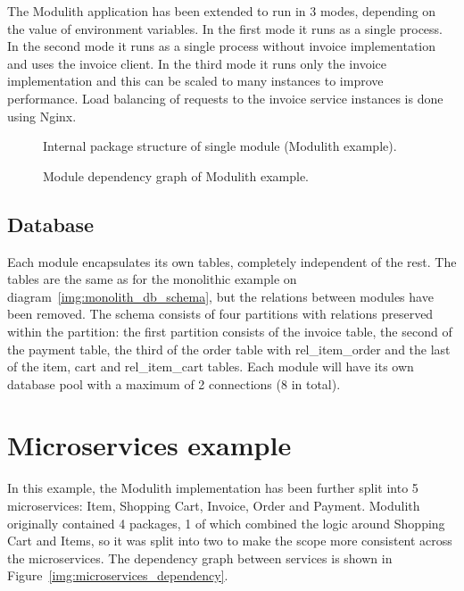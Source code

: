 The Modulith application has been extended to run in 3 modes, depending on the value of environment variables. In the first mode it runs as a single process. In the second mode it runs as a single process without invoice implementation and uses the invoice client. In the third mode it runs only the invoice implementation and this can be scaled to many instances to improve performance. Load balancing of requests to the invoice service instances is done using Nginx.

\begin{figure}
    \centering
    
    \caption{Internal package structure of single module (Modulith example).\label{img:modulith_module_package}}
\end{figure}

\begin{figure}
    \centering
    
    \caption{Module dependency graph of Modulith example. \label{img:modulith_package}}
\end{figure}

\subsection{Database}
Each module encapsulates its own tables, completely independent of the rest. The tables are the same as for the monolithic example on diagram~\ref{img:monolith_db_schema}, but the relations between modules have been removed. The schema consists of four partitions with relations preserved within the partition: the first partition consists of the invoice table, the second of the payment table, the third of the order table with rel\_item\_order and the last of the item, cart and rel\_item\_cart tables. Each module will have its own database pool with a maximum of 2 connections (8 in total).


\section{Microservices example}
In this example, the Modulith implementation has been further split into 5 microservices: Item, Shopping Cart, Invoice, Order and Payment. Modulith originally contained 4 packages, 1 of which combined the logic around Shopping Cart and Items, so it was split into two to make the scope more consistent across the microservices. The dependency graph between services is shown in Figure~\ref{img:microservices_dependency}.

